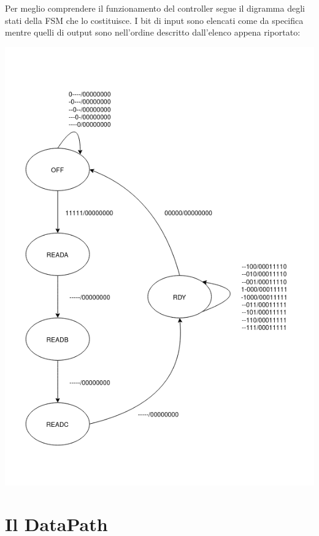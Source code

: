\documentclass[
  12pt,
  a4paper,
  headings=optiontoheadandtoc
]{scrreprt}
\begin{document}
Per meglio comprendere il funzionamento del controller segue il digramma degli stati della FSM che lo costituisce. I bit di input sono elencati come da specifica mentre quelli di output sono nell'ordine descritto dall'elenco appena riportato:

\Centering
\includegraphics[scale=0.75]{controller}

\RaggedRight

\section[nonumber=true]{Il DataPath}
\end{document}
